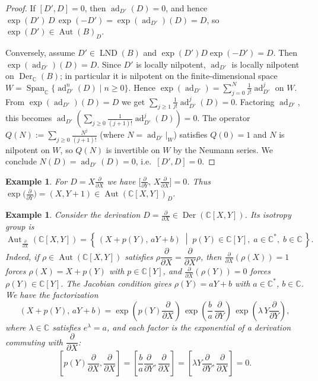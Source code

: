 \documentclass[11pt,a4paper,reqno]{amsart}
\newtheorem{example}[theorem]{Example}
\newcommand{\LND}[0]{\ensuremath{\operatorname{LND}}}
\newcommand{\Aut}[0]{\ensuremath{\operatorname{Aut}}}
\begin{document}
\begin{proof}
If $[D',D]=0$, then $\operatorname{ad}_{D'}(D)=0$, and hence
$
\exp(D')\,D\,\exp(-D')
=
\exp(\operatorname{ad}_{D'})(D)
=
D$, so $\exp(D')\in\Aut(B)_D$.
 
Conversely, assume $D'\in\LND(B)$ and $\exp(D')D\exp(-D')=D$. Then $\exp(\operatorname{ad}_{D'})(D)=D$.
Since $D'$ is locally nilpotent, $\operatorname{ad}_{D'}$ is locally nilpotent on $\operatorname{Der}_{\mathbb{C}}(B)$; in particular it is nilpotent on the finite-dimensional space $W=\operatorname{Span}_{\mathbb{C}}\{\operatorname{ad}_{D'}^{n}(D)\mid n\ge 0\}$.
Hence $\exp(\operatorname{ad}_{D'})=\sum_{j=0}^{N}\frac{1}{j!}\operatorname{ad}_{D'}^{j}$ on $W$. From $\exp(\operatorname{ad}_{D'})(D)=D$ we get $\sum_{j\ge 1}\frac{1}{j!}\operatorname{ad}_{D'}^{j}(D)=0$.
Factoring $\operatorname{ad}_{D'}$, this becomes
$\operatorname{ad}_{D'}\!\left(\sum_{j\ge 0}\frac{1}{(j+1)!}\operatorname{ad}_{D'}^{j}(D)\right)=0$.
The operator $Q(N):=\sum_{j\ge 0}\frac{N^j}{(j+1)!}$ (where $N=\operatorname{ad}_{D'}|_W$) satisfies $Q(0)=1$ and $N$ is nilpotent on $W$, so $Q(N)$ is invertible on $W$ by the Neumann series. We conclude $N(D)=\operatorname{ad}_{D'}(D)=0$, i.e.\ $[D',D]=0$.
\end{proof}
 
\begin{example}
For $D=X\frac{\partial}{\partial X}$ we have
$\big[\frac{\partial}{\partial Y},\,X\frac{\partial}{\partial X}\big]=0$.
Thus $\exp\!\big(\frac{\partial}{\partial Y}\big)=(X,Y+1)\in \Aut(\mathbb{C}[X,Y])_D$.
\end{example}
 
\begin{example}
Consider the derivation $D=\tfrac{\partial}{\partial X}\in \operatorname{Der}(\mathbb{C}[X,Y])$.  
Its isotropy group is
\[
\operatorname{Aut}_{\frac{\partial}{\partial X}}(\mathbb{C}[X,Y])
=\left\{\,(X+p(Y),\,aY+b)\;\middle|\; p(Y)\in \mathbb{C}[Y],\; a\in \mathbb{C}^*,\; b\in \mathbb{C}\,\right\}.
\]
Indeed, if $\rho\in\Aut(\mathbb{C}[X,Y])$ satisfies $\rho\dfrac{\partial}{\partial X}=\dfrac{\partial}{\partial X}\rho$, then
$\frac{\partial}{\partial X}(\rho(X))=1$ forces $\rho(X)=X+p(Y)$ with $p\in\mathbb{C}[Y]$, and
$\frac{\partial}{\partial X}(\rho(Y))=0$ forces $\rho(Y)\in\mathbb{C}[Y]$. The Jacobian condition gives
$\rho(Y)=aY+b$ with $a\in\mathbb{C}^*$, $b\in\mathbb{C}$.
We have the factorization
\[
(X+p(Y),\,aY+b)
= \exp\!\left(p(Y)\dfrac{\partial}{\partial X}\right)\,
  \exp\!\left(\dfrac{b}{a}\,\dfrac{\partial}{\partial Y}\right)\,
  \exp\!\left(\lambda\,Y\dfrac{\partial}{\partial Y}\right),
\]
where $\lambda\in\mathbb{C}$ satisfies $e^\lambda=a$, and each factor is the exponential of a derivation commuting with $\dfrac{\partial}{\partial X}$:
\[
\left[p(Y)\dfrac{\partial}{\partial X},\dfrac{\partial}{\partial X}\right]=\left[\dfrac{b}{a}\dfrac{\partial}{\partial Y},\dfrac{\partial}{\partial X}\right]=\left[\lambda Y\dfrac{\partial}{\partial Y},\dfrac{\partial}{\partial X}\right]=0.
\]
\end{example}
 
\end{document}
